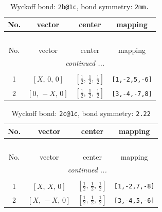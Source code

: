 \documentclass[fleqn,8pt]{jsarticle}
\begin{document}
\renewcommand{\arraystretch}{1.2}
\begin{longtable}{cccc}
\caption{Wyckoff bond: {\tt 2b@1c}, bond symmetry: {\tt 2mm.}}
 \\
 \hline \hline
No. & vector & center & mapping \\ \hline \endfirsthead

\multicolumn{3}{l}{\tablename\ \thetable{}} \\
 \hline \hline
No. & vector & center & mapping \\ \hline \endhead

 \hline \hline
\multicolumn{3}{r}{\footnotesize\it continued ...} \\ \endfoot

 \hline \hline
\multicolumn{3}{r}{} \\ \endlastfoot

1 & $\left[ X,\, 0,\, 0 \right]$ & $\left[ \frac{1}{2},\, \frac{1}{2},\, \frac{1}{2} \right]$ & {\tt [1,-2,5,-6]} \\ \hline
2 & $\left[ 0,\, - X,\, 0 \right]$ & $\left[ \frac{1}{2},\, \frac{1}{2},\, \frac{1}{2} \right]$ & {\tt [3,-4,-7,8]} \\
\end{longtable}
\renewcommand{\arraystretch}{1.2}
\begin{longtable}{cccc}
\caption{Wyckoff bond: {\tt 2c@1c}, bond symmetry: {\tt 2.22}}
 \\
 \hline \hline
No. & vector & center & mapping \\ \hline \endfirsthead

\multicolumn{3}{l}{\tablename\ \thetable{}} \\
 \hline \hline
No. & vector & center & mapping \\ \hline \endhead

 \hline \hline
\multicolumn{3}{r}{\footnotesize\it continued ...} \\ \endfoot

 \hline \hline
\multicolumn{3}{r}{} \\ \endlastfoot

1 & $\left[ X,\, X,\, 0 \right]$ & $\left[ \frac{1}{2},\, \frac{1}{2},\, \frac{1}{2} \right]$ & {\tt [1,-2,7,-8]} \\ \hline
2 & $\left[ X,\, - X,\, 0 \right]$ & $\left[ \frac{1}{2},\, \frac{1}{2},\, \frac{1}{2} \right]$ & {\tt [3,-4,5,-6]} \\
\end{longtable}
\renewcommand{\arraystretch}{1.2}
\end{document}
